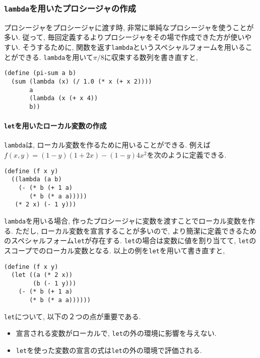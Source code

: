 \subsubsection{\lstinline{lambda}を用いたプロシージャの作成}
プロシージャをプロシージャに渡す時, 非常に単純なプロシージャを使うことが多い.
従って, 毎回定義するよりプロシージャをその場で作成できた方が使いやすい.
そうするために, 関数を返す\lstinline{lambda}というスペシャルフォームを用いることができる.
\lstinline{lambda}を用いて$\pi/8$に収束する数列を書き直すと,

\begin{lstlisting}[basicstyle=\footnotesize,title=一般的な和の関数と\lstinline{lambda}を用いた$\pi/8$に収束する数列]
(define (pi-sum a b)
  (sum (lambda (x) (/ 1.0 (* x (+ x 2))))
       a
       (lambda (x (+ x 4))
       b))
\end{lstlisting}

\paragraph{\lstinline{let}を用いたローカル変数の作成} \lstinline{lambda}は,
ローカル変数を作るために用いることができる. 例えば$f(x,y) = (1-y)(1+2x) - (1-y)4x^2$を次のように定義できる.

\begin{lstlisting}[basicstyle=\footnotesize]
(define (f x y)
  ((lambda (a b)
    (- (* b (+ 1 a)
       (* b (* a a)))))
   (* 2 x) (- 1 y)))
\end{lstlisting}

\lstinline{lambda}を用いる場合, 作ったプロシージャに変数を渡すことでローカル変数を作る.
ただし, ローカル変数を宣言することが多いので, より簡潔に定義できるためのスペシャルフォーム\lstinline{let}が存在する.
\lstinline{let}の場合は変数に値を割り当てて, \lstinline{let}のスコープでのローカル変数となる.
以上の例を\lstinline{let}を用いて書き直すと,

\begin{lstlisting}[basicstyle=\footnotesize]
(define (f x y)
  (let ((a (* 2 x))
        (b (- 1 y)))
    (- (* b (+ 1 a)
       (* b (* a a))))))
\end{lstlisting}

\lstinline{let}について, 以下の２つの点が重要である.

\begin{itemize}
\item 宣言される変数がローカルで, \lstinline{let}の外の環境に影響を与えない.
\item \lstinline{let}を使った変数の宣言の式は\lstinline{let}の外の環境で評価される.
\end{itemize}
